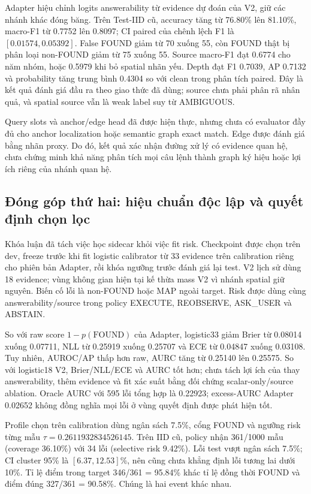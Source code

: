 Adapter hiệu chỉnh logits answerability từ evidence dự đoán của V2, giữ các nhánh khác đóng băng. Trên Test-IID cũ, accuracy tăng từ 76.80\% lên 81.10\%, macro-F1 từ 0.7752 lên 0.8097; CI paired của chênh lệch F1 là $[0.01574,0.05392]$. False FOUND giảm từ 70 xuống 55, còn FOUND thật bị phân loại non-FOUND giảm từ 75 xuống 55.
Source macro-F1 đạt 0.6774 cho năm nhóm, hoặc 0.5979 khi bỏ spatial
nhãn yếu. Depth đạt F1 0.7039, AP 0.7132 và probability tăng trung
bình 0.4304 so với clean trong phân tích paired. Đây là kết quả đánh
giá đầu ra theo giao thức đã dùng; source chưa phải phân rã nhân quả,
và spatial source vẫn là weak label suy từ AMBIGUOUS.

Query slots và anchor/edge head đã được hiện thực, nhưng chưa có
evaluator đầy đủ cho anchor localization hoặc semantic graph exact
match. Edge được đánh giá bằng nhãn proxy. Do đó, kết quả xác nhận
đường xử lý có evidence quan hệ, chưa chứng minh khả năng phân tích
mọi câu lệnh thành graph ký hiệu hoặc lợi ích riêng của nhánh quan hệ.

\subsection{Đóng góp thứ hai: hiệu chuẩn độc lập và quyết định chọn lọc}

Khóa luận đã tách việc học sidecar khỏi việc fit risk. Checkpoint
được chọn trên dev, freeze trước khi fit logistic calibrator từ
33 evidence trên calibration riêng cho phiên bản Adapter, rồi khóa ngưỡng trước đánh giá lại test. V2 lịch sử dùng 18 evidence; vùng không gian hiện tại kế thừa mass V2 vì nhánh spatial giữ nguyên.
Biến cố lỗi là non-FOUND hoặc MAP ngoài target. Risk được dùng cùng
answerability/source trong policy EXECUTE, REOBSERVE, ASK\_USER và ABSTAIN.

{\setlength{\emergencystretch}{3em}
So với raw score $1-p(\mathrm{FOUND})$ của Adapter, logistic33 giảm
Brier từ 0.08014 xuống 0.07711, NLL từ 0.25919 xuống 0.25707 và
ECE từ 0.04847 xuống 0.03108. Tuy nhiên, AUROC/AP thấp hơn raw,
AURC tăng từ 0.25140 lên 0.25575. So với logistic18 V2,
Brier/NLL/ECE và AURC tốt hơn; chưa tách lợi ích của thay answerability,
thêm evidence và fit xác suất bằng đối chứng scalar-only/source ablation.
Oracle AURC với 595 lỗi tổng hợp là 0.22923; excess-AURC Adapter
0.02652 không đồng nghĩa mọi lỗi ở vùng quyết định được phát hiện tốt.\par}


Profile chọn trên calibration dùng ngân sách 7.5\%, cổng FOUND và
ngưỡng risk từng mẫu $\tau=0.2611932834526145$. Trên IID cũ, policy
nhận 361/1000 mẫu (coverage 36.10\%) với 34 lỗi (selective risk 9.42\%).
Lỗi test vượt ngân sách 7.5\%; CI cluster 95\% là $[6.37,12.53]\%$,
nên cũng chưa khẳng định lỗi tương lai dưới 10\%.
Tỉ lệ điểm trong target 346/361 = 95.84\% khác tỉ lệ đồng thời FOUND
và điểm đúng 327/361 = 90.58\%. Chúng là hai event khác nhau.

